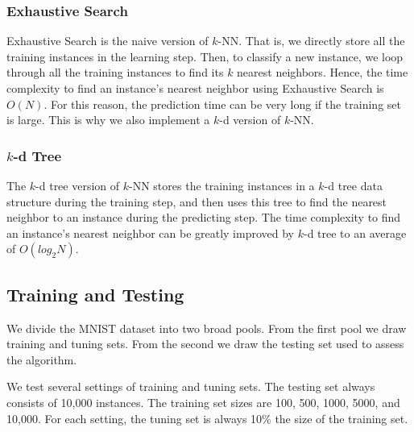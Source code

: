 \subsubsection{Exhaustive Search}
Exhaustive Search is the naive version of $k$-NN. That is, we directly store all the training instances in the learning step. Then, to classify a new instance, we loop through all the training instances to find its $k$ nearest neighbors. Hence, the time complexity to find an instance's nearest neighbor using Exhaustive Search is $O(N)$. For this reason, the prediction time can be very long if the training set is large. This is why we also implement a $k$-d version of $k$-NN.

\subsubsection{$k$-d Tree}
The $k$-d tree version of $k$-NN stores the training instances in a $k$-d tree data structure during the training step, and then uses this tree to find the nearest neighbor to an instance during the predicting step. The time complexity to find an instance's nearest neighbor can be greatly improved by $k$-d tree to an average of $O(log_2N)$.

\subsection{Training and Testing}
We divide the MNIST dataset into two broad pools.  From the first pool we draw training and tuning sets.  From the second we draw the testing set used to assess the algorithm.

We test several settings of training and tuning sets.  The testing set always consists of 10,000 instances.  The training set sizes are 100, 500, 1000, 5000, and 10,000. For each setting, the tuning set is always 10\% the size of the training set.
